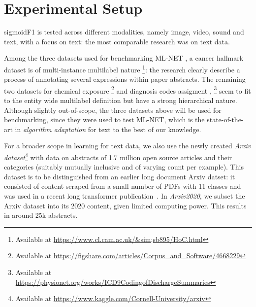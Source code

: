 
\section{Experimental Setup}
\label{sec:orgb44ba25}

sigmoidF1 is tested across different modalities, namely image, video, sound and text, with a focus on text: the most comparable research was on text data.


Among the three datasets used for benchmarking ML-NET \cite{multitaskLabel}, a cancer hallmark dataset is of multi-instance multilabel nature \cite{cancerHallmarks}\footnote{Available at \url{https://www.cl.cam.ac.uk/&sim;sb895/HoC.html}}: the research clearly describe a process of annotating several expressions within paper abstracts.  The remaining two datasets for chemical exposure \cite{chemExposure}\footnote{Available at \url{https://figshare.com/articles/Corpus_and_Software/4668229}} and diagnosis codes assigment \cite{diagnosisCode}, \footnote{Available at \url{https://physionet.org/works/ICD9CodingofDischargeSummaries}} seem to fit to the entity wide multilabel definition but have a strong hierarchical nature. Although slightly out-of-scope, the three datasets above will be used for benchmarking, since they were used to test ML-NET, which is the state-of-the-art in \emph{algorithm adaptation} for text to the best of our knowledge.

For a broader scope in learning for text data, we also use the newly created \emph{Arxiv dataset}\footnote{Available at \url{https://www.kaggle.com/Cornell-University/arxiv}} with data on abstracts of 1.7 million open source articles and their categories (suitably mutually inclusive and of varying count per example). This dataset is to be distinguished from an earlier long document Arxiv datset: it consisted of content scraped from a small number of PDFs with 11 classes \cite{oldArxiv} and was used in a recent long transformer publication~\cite{bigBird}. In \textit{Arxiv2020}, we subset the Arxiv dataset into its 2020 content, given limited computing power. This results in around 25k abstracts.

